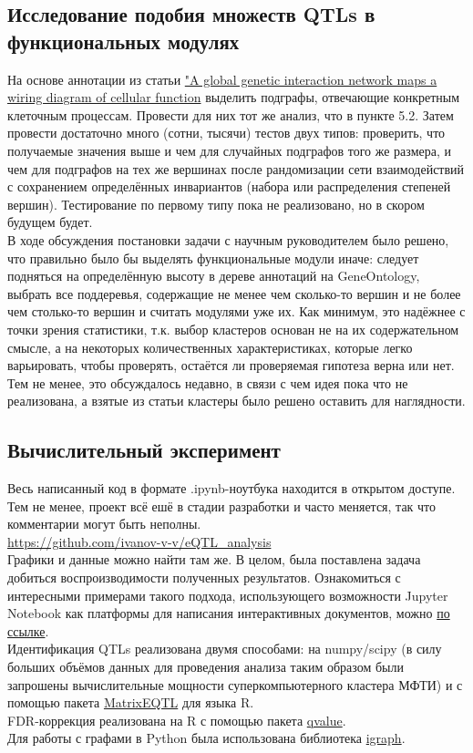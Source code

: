 \documentclass[11pt,a4paper]{report}
\theoremstyle{definition}
\theoremstyle{definition}
\theoremstyle{definition}
\begin{document}
	\subsection{Исследование подобия множеств QTLs в функциональных модулях}
	На основе аннотации из статьи \href{https://labs.genetics.ucla.edu/kruglyak/home}{"A global genetic interaction network maps a wiring diagram of cellular function} выделить подграфы, отвечающие конкретным клеточным процессам. Провести для них тот же анализ, что в пункте 5.2. Затем провести достаточно много (сотни, тысячи) тестов двух типов: проверить, что получаемые значения выше и чем для случайных подграфов того же размера, и чем для подграфов на тех же вершинах после рандомизации сети взаимодействий с сохранением определённых инвариантов (набора или распределения степеней вершин). Тестирование по первому типу пока не реализовано, но в скором будущем будет.\\
	В ходе обсуждения постановки задачи с научным руководителем было решено, что правильно было бы выделять функциональные модули иначе: следует подняться на определённую высоту в дереве аннотаций на GeneOntology, выбрать все поддеревья, содержащие не менее чем сколько-то вершин и не более чем столько-то вершин и считать модулями уже их. Как минимум, это надёжнее с точки зрения статистики, т.к. выбор кластеров основан не на их содержательном смысле, а на некоторых количественных характеристиках, которые легко варьировать, чтобы проверять, остаётся ли проверяемая гипотеза верна или нет. Тем не менее, это обсуждалось недавно, в связи с чем идея пока что не реализована, а взятые из статьи кластеры было решено оставить для наглядности.
	\subsection{Вычислительный эксперимент}
	Весь написанный код в формате .ipynb-ноутбука находится в открытом доступе. Тем не менее, проект всё ешё в стадии разработки и часто меняется, так что комментарии могут быть неполны.\\ \url{https://github.com/ivanov-v-v/eQTL_analysis}\\
	Графики и данные можно найти там же. В целом, была поставлена задача добиться воспроизводимости полученных результатов. Ознакомиться с интересными примерами такого подхода, использующего возможности Jupyter Notebook как платформы для написания интерактивных документов, можно \href{https://github.com/jupyter/jupyter/wiki/A-gallery-of-interesting-Jupyter-Notebooks#reproducible-academic-publications}{по ссылке}.\\
	Идентификация QTLs реализована двумя способами: на numpy/scipy (в силу больших объёмов данных для проведения анализа таким образом были запрошены вычислительные мощности суперкомпьютерного кластера МФТИ) и с помощью пакета \href{http://www.bios.unc.edu/research/genomic_software/Matrix_eQTL/}{MatrixEQTL} для языка R.\\ 
	FDR-коррекция реализована на R с помощью пакета \href{http://www.bioconductor.org/packages/release/bioc/html/qvalue.html}{qvalue}.\\
	Для работы с графами в Python была использована библиотека \href{http://igraph.org/redirect.html}{igraph}.
	
\end{document}

